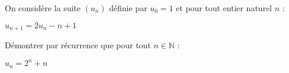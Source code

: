 
%
On considère la suite $(u_n)$ définie par $u_0=1$ et pour tout entier naturel $n$ : 

\begin{center}
$ u_{n+1}=2u_n-n+1$
\end{center}
\par
Démontrer par récurrence que pour tout $n \in \mathbb{N}$ : 

\begin{center}
$u_n=2^n+n$
\end{center}

